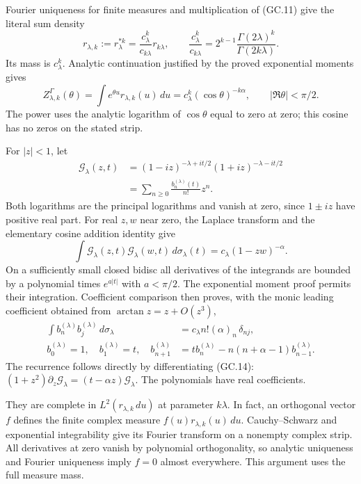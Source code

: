 Fourier uniqueness for finite measures and multiplication of (GC.11)
give the literal sum density
\[
 r_{\lambda,k}:=r_\lambda^{*k}
   =\frac{c_\lambda^k}{c_{k\lambda}}r_{k\lambda},\qquad
 \frac{c_\lambda^k}{c_{k\lambda}}
   =2^{k-1}\frac{\Gamma(2\lambda)^k}{\Gamma(2k\lambda)}.
                                                               \tag{GC.12}
\]
Its mass is $c_\lambda^k$. Analytic continuation justified by the
proved exponential moments gives
\[
 Z_{\lambda,k}^\Gamma(\theta)
 =\int e^{\theta u}r_{\lambda,k}(u)\,du
 =c_\lambda^k(\cos\theta)^{-k\alpha},
 \qquad |\Re\theta|<\pi/2.                                   \tag{GC.13}
\]
The power uses the analytic logarithm of $\cos\theta$ equal to zero
at zero; this cosine has no zeros on the stated strip.

For $|z|<1$, let
\[
 \begin{split}
 \mathcal G_\lambda(z,t)
  &=(1-iz)^{-\lambda+it/2}(1+iz)^{-\lambda-it/2}\\
  &=\sum_{n\ge0}\frac{b_n^{(\lambda)}(t)}{n!}z^n.
 \end{split}                                                   \tag{GC.14}
\]
Both logarithms are the principal logarithms and vanish at zero,
since $1\pm iz$ have positive real part. For real $z,w$ near zero,
the Laplace transform and the elementary cosine addition identity give
\[
 \int\mathcal G_\lambda(z,t)\mathcal G_\lambda(w,t)
              \,d\sigma_\lambda(t)
 =c_\lambda(1-zw)^{-\alpha}.
\]
On a sufficiently small closed bidisc all derivatives of the
integrands are bounded by a polynomial times $e^{a|t|}$ with
$a<\pi/2$. The exponential moment proof permits their integration.
Coefficient comparison then proves, with the monic leading
coefficient obtained from $\arctan z=z+O(z^3)$,
\[
 \begin{split}
 \int b_n^{(\lambda)}b_j^{(\lambda)}\,d\sigma_\lambda
   &=c_\lambda n!(\alpha)_n\,\delta_{nj},\\
 b_0^{(\lambda)}=1,\quad b_1^{(\lambda)}=t,\quad
 b_{n+1}^{(\lambda)}
   &=t b_n^{(\lambda)}-n(n+\alpha-1)b_{n-1}^{(\lambda)}.
 \end{split}                                                   \tag{GC.15}
\]
The recurrence follows directly by differentiating (GC.14):
$(1+z^2)\partial_z\mathcal G_\lambda=(t-\alpha z)\mathcal G_\lambda$.
The polynomials have real coefficients.

They are complete in $L^2(r_{\lambda,k}\,du)$ at parameter $k\lambda$.
In fact, an orthogonal vector $f$ defines the finite complex measure
$f(u)r_{\lambda,k}(u)\,du$. Cauchy--Schwarz and exponential
integrability give its Fourier transform on a nonempty complex strip.
All derivatives at zero vanish by polynomial orthogonality, so
analytic uniqueness and Fourier uniqueness imply $f=0$ almost
everywhere. This argument uses the full measure mass.

